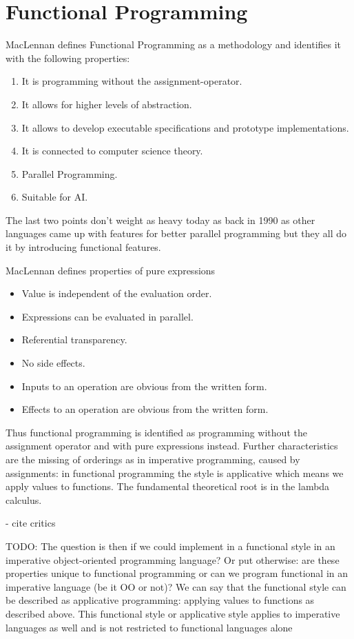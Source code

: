 \chapter{Functional Programming}
MacLennan \cite{maclennan_functional_1990} defines Functional Programming as a methodology and identifies it with the following properties:

\begin{enumerate}
	\item It is programming without the assignment-operator.
	\item It allows for higher levels of abstraction.
	\item It allows to develop executable specifications and prototype implementations.
	\item It is connected to computer science theory.
	\item Parallel Programming.
	\item Suitable for AI.
\end{enumerate}

The last two points don't weight as heavy today as back in 1990 as other languages came up with features for better parallel programming but they all do it by introducing functional features.

MacLennan \cite{maclennan_functional_1990} defines properties of pure expressions 
\begin{itemize}
	\item Value is independent of the evaluation order.
	\item Expressions can be evaluated in parallel.
	\item Referential transparency.
	\item No side effects.
	\item Inputs to an operation are obvious from the written form.
	\item Effects to an operation are obvious from the written form.
\end{itemize}

Thus functional programming is identified as programming without the assignment operator and with pure expressions instead. Further characteristics are the missing of orderings as in imperative programming, caused by assignments: in functional programming the style is applicative which means we apply values to functions. The fundamental theoretical root is in the lambda calculus.

- cite critics

TODO: The question is then if we could implement in a functional style in an imperative object-oriented programming language? Or put otherwise: are these properties unique to functional programming or can we program functional in an imperative language (be it OO or not)? We can say that the functional style can be described as applicative programming: applying values to functions as described above. This functional style or applicative style applies to imperative languages as well and is not restricted to functional languages alone

